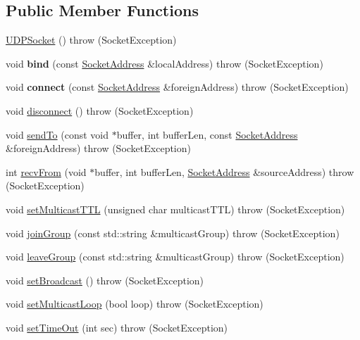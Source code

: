 \subsection*{Public Member Functions}
\begin{DoxyCompactItemize}
\item 
\hyperlink{class_u_d_p_socket_a4f86f3023f5a08f6355802599a10e100}{U\+D\+P\+Socket} ()  throw (\+Socket\+Exception)
\item 
void {\bfseries bind} (const \hyperlink{class_socket_address}{Socket\+Address} \&local\+Address)  throw (\+Socket\+Exception)\hypertarget{class_u_d_p_socket_a18915dd8609903c63c556d3c6ba2652c}{}\label{class_u_d_p_socket_a18915dd8609903c63c556d3c6ba2652c}

\item 
void {\bfseries connect} (const \hyperlink{class_socket_address}{Socket\+Address} \&foreign\+Address)  throw (\+Socket\+Exception)\hypertarget{class_u_d_p_socket_aa69a4d93d1db3f64af411ddf44b1ef84}{}\label{class_u_d_p_socket_aa69a4d93d1db3f64af411ddf44b1ef84}

\item 
void \hyperlink{class_u_d_p_socket_a7482e8e61cef160e1a7c0d6ac15c01be}{disconnect} ()  throw (\+Socket\+Exception)
\item 
void \hyperlink{class_u_d_p_socket_a3ade39f7c95c22fbce4606e8d7bada18}{send\+To} (const void $\ast$buffer, int buffer\+Len, const \hyperlink{class_socket_address}{Socket\+Address} \&foreign\+Address)  throw (\+Socket\+Exception)
\item 
int \hyperlink{class_u_d_p_socket_a9b03ca0796ee2ac4512147950a308b73}{recv\+From} (void $\ast$buffer, int buffer\+Len, \hyperlink{class_socket_address}{Socket\+Address} \&source\+Address)  throw (\+Socket\+Exception)
\item 
void \hyperlink{class_u_d_p_socket_a4dcfff33b45d1b84b5a602fc6f4a27f8}{set\+Multicast\+T\+TL} (unsigned char multicast\+T\+TL)  throw (\+Socket\+Exception)
\item 
void \hyperlink{class_u_d_p_socket_ac6cdb609f7f9579384129042f90cd220}{join\+Group} (const std\+::string \&multicast\+Group)  throw (\+Socket\+Exception)
\item 
void \hyperlink{class_u_d_p_socket_ad5f835c48b840e30b471e19d7c3cc2aa}{leave\+Group} (const std\+::string \&multicast\+Group)  throw (\+Socket\+Exception)
\item 
void \hyperlink{class_u_d_p_socket_a316f08a017aa160643812f3c08734d27}{set\+Broadcast} ()  throw (\+Socket\+Exception)
\item 
void \hyperlink{class_u_d_p_socket_addcdae08b9aa69fb500186285fcb0e5f}{set\+Multicast\+Loop} (bool loop)  throw (\+Socket\+Exception)
\item 
void \hyperlink{class_u_d_p_socket_a1ff7d6e0871134b270b1adc6e14e0ed3}{set\+Time\+Out} (int sec)  throw (\+Socket\+Exception)
\end{DoxyCompactItemize}
